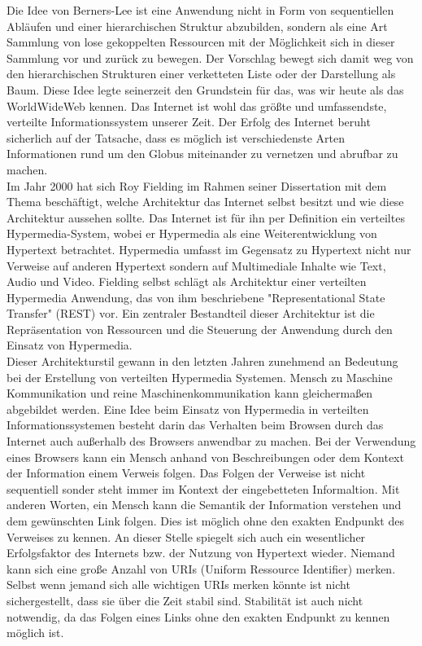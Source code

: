 Die Idee von Berners-Lee ist eine Anwendung nicht in Form von sequentiellen Abläufen und einer hierarchischen Struktur abzubilden, sondern als eine Art Sammlung von lose gekoppelten Ressourcen mit der Möglichkeit sich in dieser Sammlung vor und zurück zu bewegen. Der Vorschlag bewegt sich damit weg von den hierarchischen Strukturen einer verketteten Liste oder der Darstellung als Baum. Diese Idee legte seinerzeit den Grundstein für das, was wir heute als das WorldWideWeb kennen. Das Internet ist wohl das größte und umfassendste, verteilte Informationssystem unserer Zeit. Der Erfolg des Internet beruht sicherlich auf der Tatsache, dass es möglich ist verschiedenste Arten Informationen rund um den Globus miteinander zu vernetzen und abrufbar zu machen.\\
Im Jahr 2000 hat sich Roy Fielding im Rahmen seiner Dissertation mit dem Thema beschäftigt, welche Architektur das Internet selbst besitzt und wie diese Architektur aussehen sollte. Das Internet ist für ihn per Definition ein verteiltes Hypermedia-System, wobei er Hypermedia als eine Weiterentwicklung von Hypertext betrachtet. Hypermedia umfasst im Gegensatz zu Hypertext nicht nur Verweise auf anderen Hypertext sondern auf Multimediale Inhalte wie Text, Audio und Video. Fielding selbst schlägt als Architektur einer verteilten Hypermedia Anwendung, das von ihm beschriebene "Representational State Transfer" (REST) vor. Ein zentraler Bestandteil dieser Architektur ist die Repräsentation von Ressourcen und die Steuerung der Anwendung durch den Einsatz von Hypermedia.\\
Dieser Architekturstil gewann in den letzten Jahren zunehmend an Bedeutung bei der Erstellung von verteilten Hypermedia Systemen. Mensch zu Maschine Kommunikation und reine Maschinenkommunikation kann gleichermaßen abgebildet werden. Eine Idee beim Einsatz von Hypermedia in verteilten Informationssystemen besteht darin das Verhalten beim Browsen durch das Internet auch außerhalb des Browsers anwendbar zu machen. Bei der Verwendung eines Browsers kann ein Mensch anhand von Beschreibungen oder dem Kontext der Information einem Verweis folgen. Das Folgen der Verweise ist nicht sequentiell sonder steht immer im Kontext der eingebetteten Informaltion. Mit anderen Worten, ein Mensch kann die Semantik der Information verstehen und dem gewünschten Link folgen. Dies ist möglich ohne den exakten Endpunkt des Verweises zu kennen. An dieser Stelle spiegelt sich auch ein wesentlicher Erfolgsfaktor des Internets bzw. der Nutzung von Hypertext wieder. Niemand kann sich eine große Anzahl von URIs (Uniform Ressource Identifier) merken. Selbst wenn jemand sich alle wichtigen URIs merken könnte ist nicht sichergestellt, dass sie über die Zeit stabil sind. Stabilität ist auch nicht notwendig, da das Folgen eines Links ohne den exakten Endpunkt zu kennen möglich ist.\\
